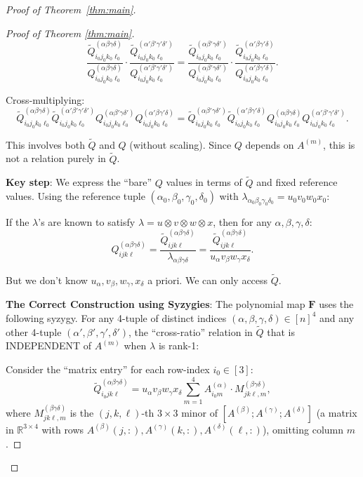 \documentclass[12pt]{article}
\theoremstyle{definition}
\begin{document}
\begin{proof}[Proof of Theorem~\ref{thm:main}]
\begin{proof}[Proof of Theorem \ref{thm:main}]
$$\frac{\tilde{Q}^{(\alpha\beta\gamma\delta)}_{i_0j_0k_0\ell_0}}{Q^{(\alpha\beta\gamma\delta)}_{i_0j_0k_0\ell_0}} \cdot \frac{\tilde{Q}^{(\alpha'\beta'\gamma'\delta')}_{i_0j_0k_0\ell_0}}{Q^{(\alpha'\beta'\gamma'\delta')}_{i_0j_0k_0\ell_0}} = \frac{\tilde{Q}^{(\alpha\beta'\gamma\delta')}_{i_0j_0k_0\ell_0}}{Q^{(\alpha\beta'\gamma\delta')}_{i_0j_0k_0\ell_0}}\cdot \frac{\tilde{Q}^{(\alpha'\beta\gamma'\delta)}_{i_0j_0k_0\ell_0}}{Q^{(\alpha'\beta\gamma'\delta)}_{i_0j_0k_0\ell_0}}.$$

Cross-multiplying:
\begin{equation}\label{eq:cross-mult}
\tilde{Q}^{(\alpha\beta\gamma\delta)}_{i_0j_0k_0\ell_0}\tilde{Q}^{(\alpha'\beta'\gamma'\delta')}_{i_0j_0k_0\ell_0}Q^{(\alpha\beta'\gamma\delta')}_{i_0j_0k_0\ell_0}Q^{(\alpha'\beta\gamma'\delta)}_{i_0j_0k_0\ell_0} = \tilde{Q}^{(\alpha\beta'\gamma\delta')}_{i_0j_0k_0\ell_0}\tilde{Q}^{(\alpha'\beta\gamma'\delta)}_{i_0j_0k_0\ell_0}Q^{(\alpha\beta\gamma\delta)}_{i_0j_0k_0\ell_0}Q^{(\alpha'\beta'\gamma'\delta')}_{i_0j_0k_0\ell_0}.
\end{equation}

This involves both $\tilde{Q}$ and $Q$ (without scaling). Since $Q$ depends on $A^{(m)}$, this is not a relation purely in $\tilde{Q}$.

\textbf{Key step}: We express the ``bare'' $Q$ values in terms of $\tilde{Q}$ and fixed reference values. Using the reference tuple $(\alpha_0,\beta_0,\gamma_0,\delta_0)$ with $\lambda_{\alpha_0\beta_0\gamma_0\delta_0} = u_0 v_0 w_0 x_0$:

If the $\lambda$'s are known to satisfy $\lambda = u\otimes v\otimes w\otimes x$, then for any $\alpha,\beta,\gamma,\delta$:
$$Q^{(\alpha\beta\gamma\delta)}_{ijk\ell} = \frac{\tilde{Q}^{(\alpha\beta\gamma\delta)}_{ijk\ell}}{\lambda_{\alpha\beta\gamma\delta}} = \frac{\tilde{Q}^{(\alpha\beta\gamma\delta)}_{ijk\ell}}{u_\alpha v_\beta w_\gamma x_\delta}.$$

But we don't know $u_\alpha,v_\beta,w_\gamma,x_\delta$ a priori. We can only access $\tilde{Q}$.

\textbf{The Correct Construction using Syzygies}: The polynomial map $\mathbf{F}$ uses the following syzygy. For any 4-tuple of distinct indices $(\alpha,\beta,\gamma,\delta)\in[n]^4$ and any other 4-tuple $(\alpha',\beta',\gamma',\delta')$, the ``cross-ratio'' relation in $\tilde{Q}$ that is INDEPENDENT of $A^{(m)}$ when $\lambda$ is rank-1:

Consider the ``matrix entry'' for each row-index $i_0\in[3]$:
$$\tilde{Q}^{(\alpha\beta\gamma\delta)}_{i_0 j k \ell} = u_\alpha v_\beta w_\gamma x_\delta\sum_{m=1}^4 A^{(\alpha)}_{i_0 m}\cdot M^{(\beta\gamma\delta)}_{jk\ell,m},$$
where $M^{(\beta\gamma\delta)}_{jk\ell,m}$ is the $(j,k,\ell)$-th $3\times 3$ minor of $[A^{(\beta)};A^{(\gamma)};A^{(\delta)}]$ (a matrix in $\mathbb{R}^{3\times 4}$ with rows $A^{(\beta)}(j,:),A^{(\gamma)}(k,:),A^{(\delta)}(\ell,:)$), omitting column $m$.


\end{proof}
\end{proof}
\end{document}
